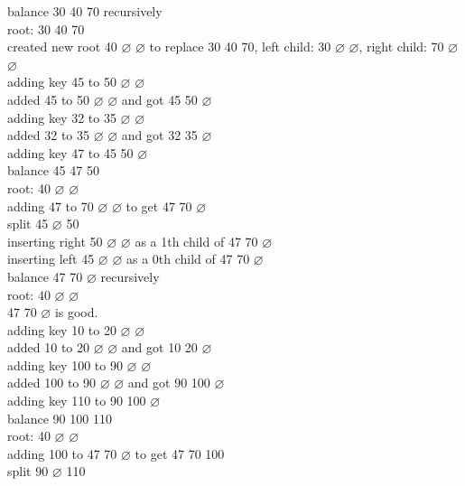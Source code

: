 \documentclass[a4paper,12pt]{article}
\begin{document}
balance 30 40 70 recursively\\[0pt]
root: 30 40 70\\[0pt]
created new root 40 \(\varnothing\) \(\varnothing\) to replace 30 40 70, left child: 30 \(\varnothing\) \(\varnothing\), right child: 70 \(\varnothing\) \(\varnothing\)\\[0pt]
adding key 45 to 50 \(\varnothing\) \(\varnothing\)\\[0pt]
added 45 to 50 \(\varnothing\) \(\varnothing\) and got 45 50 \(\varnothing\)\\[0pt]
adding key 32 to 35 \(\varnothing\) \(\varnothing\)\\[0pt]
added 32 to 35 \(\varnothing\) \(\varnothing\) and got 32 35 \(\varnothing\)\\[0pt]
adding key 47 to 45 50 \(\varnothing\)\\[0pt]
balance 45 47 50\\[0pt]
root: 40 \(\varnothing\) \(\varnothing\)\\[0pt]
adding 47 to 70 \(\varnothing\) \(\varnothing\) to get 47 70 \(\varnothing\)\\[0pt]
split 45 \(\varnothing\) 50\\[0pt]
inserting right 50 \(\varnothing\) \(\varnothing\) as a 1th child of 47 70 \(\varnothing\)\\[0pt]
inserting left 45 \(\varnothing\) \(\varnothing\) as a 0th child of 47 70 \(\varnothing\)\\[0pt]
balance 47 70 \(\varnothing\) recursively\\[0pt]
root: 40 \(\varnothing\) \(\varnothing\)\\[0pt]
47 70 \(\varnothing\) is good.\\[0pt]
adding key 10 to 20 \(\varnothing\) \(\varnothing\)\\[0pt]
added 10 to 20 \(\varnothing\) \(\varnothing\) and got 10 20 \(\varnothing\)\\[0pt]
adding key 100 to 90 \(\varnothing\) \(\varnothing\)\\[0pt]
added 100 to 90 \(\varnothing\) \(\varnothing\) and got 90 100 \(\varnothing\)\\[0pt]
adding key 110 to 90 100 \(\varnothing\)\\[0pt]
balance 90 100 110\\[0pt]
root: 40 \(\varnothing\) \(\varnothing\)\\[0pt]
adding 100 to 47 70 \(\varnothing\) to get 47 70 100\\[0pt]
split 90 \(\varnothing\) 110\\[0pt]
\end{document}

